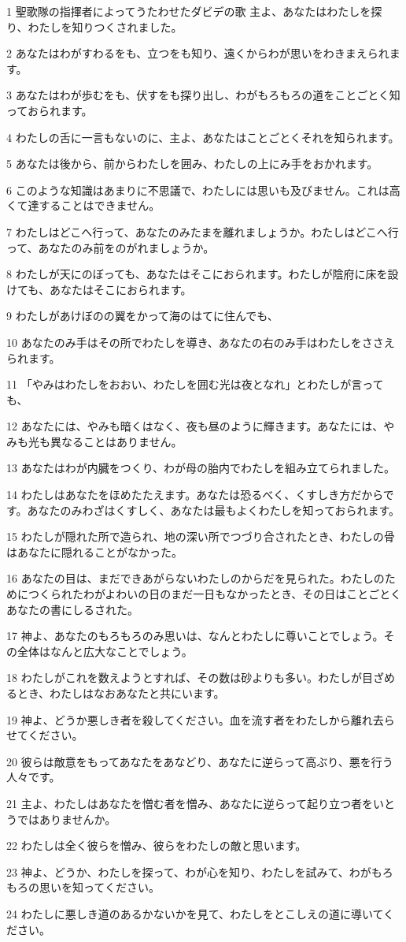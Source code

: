 \par 1 聖歌隊の指揮者によってうたわせたダビデの歌 主よ、あなたはわたしを探り、わたしを知りつくされました。
\par 2 あなたはわがすわるをも、立つをも知り、遠くからわが思いをわきまえられます。
\par 3 あなたはわが歩むをも、伏すをも探り出し、わがもろもろの道をことごとく知っておられます。
\par 4 わたしの舌に一言もないのに、主よ、あなたはことごとくそれを知られます。
\par 5 あなたは後から、前からわたしを囲み、わたしの上にみ手をおかれます。
\par 6 このような知識はあまりに不思議で、わたしには思いも及びません。これは高くて達することはできません。
\par 7 わたしはどこへ行って、あなたのみたまを離れましょうか。わたしはどこへ行って、あなたのみ前をのがれましょうか。
\par 8 わたしが天にのぼっても、あなたはそこにおられます。わたしが陰府に床を設けても、あなたはそこにおられます。
\par 9 わたしがあけぼのの翼をかって海のはてに住んでも、
\par 10 あなたのみ手はその所でわたしを導き、あなたの右のみ手はわたしをささえられます。
\par 11 「やみはわたしをおおい、わたしを囲む光は夜となれ」とわたしが言っても、
\par 12 あなたには、やみも暗くはなく、夜も昼のように輝きます。あなたには、やみも光も異なることはありません。
\par 13 あなたはわが内臓をつくり、わが母の胎内でわたしを組み立てられました。
\par 14 わたしはあなたをほめたたえます。あなたは恐るべく、くすしき方だからです。あなたのみわざはくすしく、あなたは最もよくわたしを知っておられます。
\par 15 わたしが隠れた所で造られ、地の深い所でつづり合されたとき、わたしの骨はあなたに隠れることがなかった。
\par 16 あなたの目は、まだできあがらないわたしのからだを見られた。わたしのためにつくられたわがよわいの日のまだ一日もなかったとき、その日はことごとくあなたの書にしるされた。
\par 17 神よ、あなたのもろもろのみ思いは、なんとわたしに尊いことでしょう。その全体はなんと広大なことでしょう。
\par 18 わたしがこれを数えようとすれば、その数は砂よりも多い。わたしが目ざめるとき、わたしはなおあなたと共にいます。
\par 19 神よ、どうか悪しき者を殺してください。血を流す者をわたしから離れ去らせてください。
\par 20 彼らは敵意をもってあなたをあなどり、あなたに逆らって高ぶり、悪を行う人々です。
\par 21 主よ、わたしはあなたを憎む者を憎み、あなたに逆らって起り立つ者をいとうではありませんか。
\par 22 わたしは全く彼らを憎み、彼らをわたしの敵と思います。
\par 23 神よ、どうか、わたしを探って、わが心を知り、わたしを試みて、わがもろもろの思いを知ってください。
\par 24 わたしに悪しき道のあるかないかを見て、わたしをとこしえの道に導いてください。

